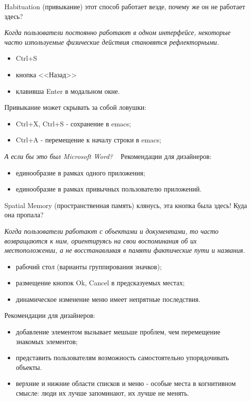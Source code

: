 \documentclass{beamer}
\begin{document}
\begin{frame}[t]	
	\begin{block}{Habituation (привыкание)}
		 этот способ работает везде, почему же он не работает здесь?
	\end{block}	
	\textit{Когда пользователи постоянно работают в одном интерфейсе, некоторые часто изпользуемые физические действия становятся рефлекторными.}
	\begin{itemize}
		\item Ctrl+S
		\item кнопка <<Назад>>
		\item клавивша Enter в модальном окне.
	\end{itemize}
	Привыкание может скрывать за собой ловушки:		
	\begin{itemize}
		\item Ctrl+X, Ctrl+S - сохранение в emacs;
		\item Ctrl+A - перемещение к началу строки в emacs;
	\end{itemize}
	\textit{А если бы это был Microsoft Word?}
	~
	Рекомендации для дизайнеров:
	\begin{itemize}
		\item единообразие в рамках одного приложения;
		\item единообразие в рамках привычных пользователю приложений.
	\end{itemize}	
\end{frame}

\begin{frame}[t]	
	\begin{block}{Spatial Memory (пространственная память)}
		 клянусь, эта кнопка была здесь! Куда она пропала?
	\end{block}	
	\textit{Когда пользователи работают с объектами и документами, то часто возвращаются к ним, ориентируясь на свои воспоминания об их местоположении, а не восстанавливая в памяти фактические пути и названия.}
	\begin{itemize}
		\item рабочий стол (варианты группирования значков);
		\item размещение кнопок Ok, Cancel в предсказуемых местах;
		\item динамическое изменение меню имеет непрятные последствия.
	\end{itemize}
	Рекомендации для дизайнеров:
	\begin{itemize}
		\item добавление элементом вызывает мешьше проблем, чем перемещение знакомых элементов;
		\item представить пользователям возможность самостоятельно упорядочивать объекты.
		\item верхние и нижние области списков и меню - особые места в когнитивном смысле: люди их лучше запоминают, их лучше не менять.		
	\end{itemize}	
\end{frame}
\end{document}
